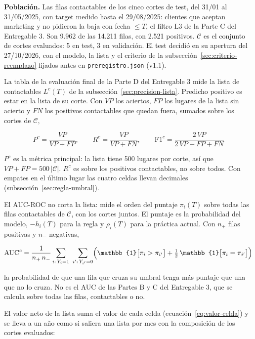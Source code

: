 \documentclass[11pt,a4paper]{article}
\begin{document}
\textbf{Población.} Las filas contactables de los cinco cortes de test, del 31/01 al 31/05/2025, con target medido hasta el 29/08/2025: clientes que aceptan marketing y no pidieron la baja con fecha $\le T$, el filtro L3 de la Parte C del Entregable 3. Son 9.962 de las 14.211 filas, con 2.521 positivos. $\mathcal C$ es el conjunto de cortes evaluados: 5 en test, 3 en validación. El test decidió en su apertura del 27/10/2026, con el modelo, la lista y el criterio de la subsección~\ref{sec:criterio-reemplazo} fijados antes en \texttt{preregistro.json} (v1.1).

La tabla de la evaluación final de la Parte D del Entregable 3 mide la lista de contactables $L^{c}(T)$ de la subsección~\ref{sec:precision-lista}. Predicho positivo es estar en la lista de su corte. Con $VP$ los aciertos, $FP$ los lugares de la lista sin acierto y $FN$ los positivos contactables que quedan fuera, sumados sobre los cortes de $\mathcal C$,

\begin{equation}
P^{c} = \frac{VP}{VP + FP}, \qquad R^{c} = \frac{VP}{VP + FN}, \qquad \mathrm{F1}^{c} = \frac{2\,VP}{2\,VP + FP + FN}
\label{eq:metricas-test}
\end{equation}

$P^{c}$ es la métrica principal: la lista tiene 500 lugares por corte, así que $VP + FP = 500\,|\mathcal C|$. $R^{c}$ es sobre los positivos contactables, no sobre todos. Con empates en el último lugar las cuatro celdas llevan decimales (subsección~\ref{sec:regla-umbral}).

El AUC-ROC no corta la lista: mide el orden del puntaje $\pi_i(T)$ sobre todas las filas contactables de $\mathcal C$, con los cortes juntos. El puntaje es la probabilidad del modelo, $-h_i(T)$ para la regla y $\rho_i(T)$ para la práctica actual. Con $n_{+}$ filas positivas y $n_{-}$ negativas,

\begin{equation}
\mathrm{AUC}^{c} = \frac{1}{n_{+}\,n_{-}} \sum_{i:\,Y_i=1}\ \sum_{i':\,Y_{i'}=0} \Bigl(\mathbb{1}\bigl[\pi_i > \pi_{i'}\bigr] + \tfrac{1}{2}\,\mathbb{1}\bigl[\pi_i = \pi_{i'}\bigr]\Bigr)
\label{eq:auc-contactables}
\end{equation}

la probabilidad de que una fila que cruza su umbral tenga más puntaje que una que no lo cruza. No es el AUC de las Partes B y C del Entregable 3, que se calcula sobre todas las filas, contactables o no.

El valor neto de la lista suma el valor de cada celda (ecuación~\eqref{eq:valor-celda}) y se lleva a un año como si saliera una lista por mes con la composición de los cortes evaluados:
\end{document}
